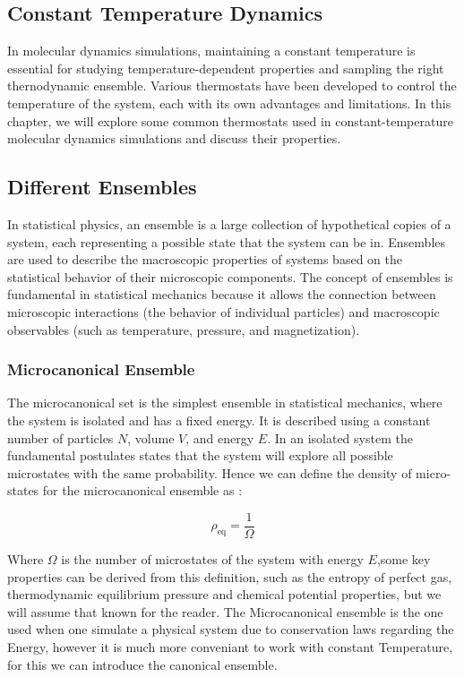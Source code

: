 \documentclass[ansiapaper]{report}
\begin{document}
\begin{multicols}{3}
	\chapter{Constant Temperature Dynamics}
	
    In molecular dynamics simulations, maintaining a constant temperature is essential for studying temperature-dependent properties and sampling the right thernodynamic ensemble. Various thermostats have been developed to control the temperature of the system, each with its own advantages and limitations. In this chapter, we will explore some common thermostats used in constant-temperature molecular dynamics simulations and discuss their properties.

    \section{Different Ensembles}

	In statistical physics, an ensemble is a large collection of hypothetical copies of a system, each representing a possible state that the system can be in. Ensembles are used to describe the macroscopic properties of systems based on the statistical behavior of their microscopic components. The concept of ensembles is fundamental in statistical mechanics because it allows the connection between microscopic interactions (the behavior of individual particles) and macroscopic observables (such as temperature, pressure, and magnetization).

    \subsection{Microcanonical Ensemble}
    The microcanonical set is the simplest ensemble in statistical mechanics, where the system is isolated and has a fixed energy. It is described using a constant number of particles $N$, volume $V$, and energy $E$. In an isolated system the fundamental postulates states that the system will explore all possible microstates with the same probability. Hence we can define the density of micro-states for the microcanonical ensemble as :

 $$ \rho_{\text{eq}} = \frac{1}{\Omega} $$

Where $ \Omega $ is the number of microstates of the system with energy $E$,some key properties can be derived from this definition, such as the entropy of perfect gas, thermodynamic equilibrium pressure and chemical potential properties, but we will assume that known for the reader. The Microcanonical ensemble is the one used when one simulate a physical system due to conservation laws regarding the Energy, however it is much more conveniant to work with constant Temperature, for this we can introduce the canonical ensemble. 


\end{multicols}
\end{document}
